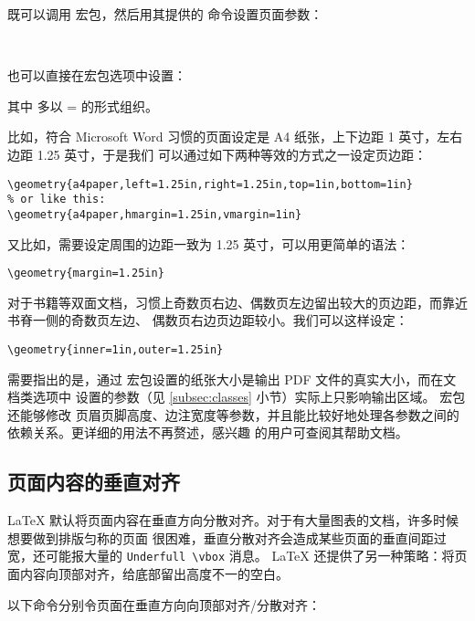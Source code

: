 既可以调用  宏包，然后用其提供的  命令设置页面参数：
\begin{command}
 \\
\end{command}
也可以直接在宏包选项中设置：
\begin{command}
\end{command}
其中  多以 = 的形式组织。

比如，符合 Microsoft Word 习惯的页面设定是 A4 纸张，上下边距 1 英寸，左右边距 1.25 英寸，于是我们
可以通过如下两种等效的方式之一设定页边距：
\begin{verbatim}
\geometry{a4paper,left=1.25in,right=1.25in,top=1in,bottom=1in}
% or like this:
\geometry{a4paper,hmargin=1.25in,vmargin=1in}
\end{verbatim}

又比如，需要设定周围的边距一致为 1.25 英寸，可以用更简单的语法：
\begin{verbatim}
\geometry{margin=1.25in}
\end{verbatim}

对于书籍等双面文档，习惯上奇数页右边、偶数页左边留出较大的页边距，而靠近书脊一侧的奇数页左边、
偶数页右边页边距较小。我们可以这样设定：
\begin{verbatim}
\geometry{inner=1in,outer=1.25in}
\end{verbatim}

需要指出的是，通过  宏包设置的纸张大小是输出 PDF 文件的真实大小，而在文档类选项中
设置的参数（见 \ref{subsec:classes} 小节）实际上只影响输出区域。 宏包还能够修改
页眉页脚高度、边注宽度等参数，并且能比较好地处理各参数之间的依赖关系。更详细的用法不再赘述，感兴趣
的用户可查阅其帮助文档。

\subsection{页面内容的垂直对齐}\label{subsec:raggedbottom}

\LaTeX{} 默认将页面内容在垂直方向分散对齐。对于有大量图表的文档，许多时候想要做到排版匀称的页面
很困难，垂直分散对齐会造成某些页面的垂直间距过宽，还可能报大量的 \verb|Underfull \vbox| 消息。
\LaTeX{} 还提供了另一种策略：将页面内容向顶部对齐，给底部留出高度不一的空白。

以下命令分别令页面在垂直方向向顶部对齐/分散对齐：
\begin{command}
 \\
\end{command}

